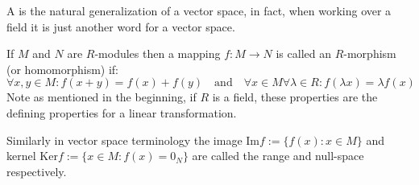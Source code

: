 \documentclass[12pt]{article}
\begin{document}
A  is the natural generalization of a vector space, in fact, when working over a field it is just another word for a vector space.

If $M$ and $N$ are $R$-modules then a mapping $f: M\to N$ is called an $R$-morphism (or homomorphism) if:
\[
\forall x,y\in M: f(x+y) = f(x) + f(y) \quad \mathrm{ and } \quad
\forall x\in M \forall \lambda \in R: f(\lambda x) = \lambda f(x)
\] Note as mentioned in the beginning, if $R$ is a field, these properties are the defining properties for a linear transformation.

Similarly in vector space terminology the image $\mathrm{Im} f := \{f(x): x\in M\}$ and kernel
$\mathrm{Ker} f := \{x\in M : f(x) = 0_N \}$ are called the range and null-space respectively.
\end{document}
